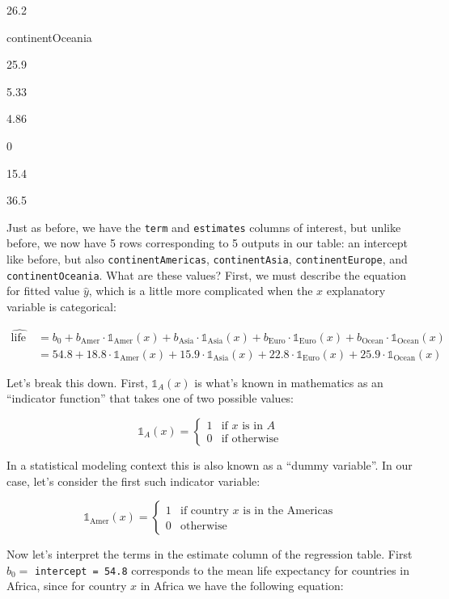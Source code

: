 \documentclass[12pt,]{krantz}
\begin{document}
26.2

continentOceania

25.9

5.33

4.86

0

15.4

36.5

Just as before, we have the \texttt{term} and \texttt{estimates} columns
of interest, but unlike before, we now have 5 rows corresponding to 5
outputs in our table: an intercept like before, but also
\texttt{continentAmericas}, \texttt{continentAsia},
\texttt{continentEurope}, and \texttt{continentOceania}. What are these
values? First, we must describe the equation for fitted value
\(\widehat{y}\), which is a little more complicated when the \(x\)
explanatory variable is categorical:

\begin{align}
\widehat{\text{life exp}} &= b_0 + b_{\text{Amer}}\cdot\mathbb{1}_{\mbox{Amer}}(x) + b_{\text{Asia}}\cdot\mathbb{1}_{\mbox{Asia}}(x)
+ b_{\text{Euro}}\cdot\mathbb{1}_{\mbox{Euro}}(x) + b_{\text{Ocean}}\cdot\mathbb{1}_{\mbox{Ocean}}(x)\\
&= 54.8 + 18.8\cdot\mathbb{1}_{\mbox{Amer}}(x) + 15.9\cdot\mathbb{1}_{\mbox{Asia}}(x)
+ 22.8\cdot\mathbb{1}_{\mbox{Euro}}(x) + 25.9\cdot\mathbb{1}_{\mbox{Ocean}}(x)
\end{align}

Let's break this down. First, \(\mathbb{1}_{A}(x)\) is what's known in
mathematics as an ``indicator function'' that takes one of two possible
values:

\[
\mathbb{1}_{A}(x) = \left\{
\begin{array}{ll}
1 & \text{if } x \text{ is in } A \\
0 & \text{if } \text{otherwise} \end{array}
\right.
\]

In a statistical modeling context this is also known as a ``dummy
variable''. In our case, let's consider the first such indicator
variable:

\[
\mathbb{1}_{\mbox{Amer}}(x) = \left\{
\begin{array}{ll}
1 & \text{if } \text{country } x \text{ is in the Americas} \\
0 & \text{otherwise}\end{array}
\right.
\]

Now let's interpret the terms in the estimate column of the regression
table. First \(b_0 =\) \texttt{intercept\ =\ 54.8} corresponds to the
mean life expectancy for countries in Africa, since for country \(x\) in
Africa we have the following equation:
\end{document}
